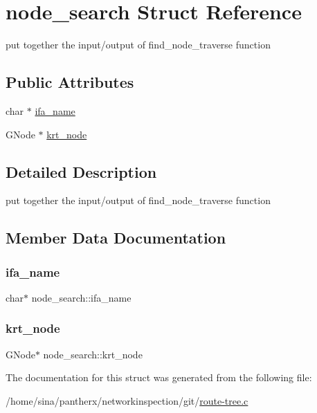 \hypertarget{structnode__search}{}\section{node\+\_\+search Struct Reference}
\label{structnode__search}


put together the input/output of find\+\_\+node\+\_\+traverse function  


\subsection*{Public Attributes}
\begin{DoxyCompactItemize}
\item 
char $\ast$ \hyperlink{structnode__search_ac34f755e54e8377475e42e4d9b1166cd}{ifa\+\_\+name}
\item 
G\+Node $\ast$ \hyperlink{structnode__search_acef2809bd08e8676c77b64dbb9f933d1}{krt\+\_\+node}
\end{DoxyCompactItemize}


\subsection{Detailed Description}
put together the input/output of find\+\_\+node\+\_\+traverse function 

\subsection{Member Data Documentation}
\mbox{\label{structnode__search_ac34f755e54e8377475e42e4d9b1166cd}} 
\subsubsection{\texorpdfstring{ifa\+\_\+name}{ifa\_name}}
{\footnotesize\ttfamily char$\ast$ node\+\_\+search\+::ifa\+\_\+name}

\mbox{\label{structnode__search_acef2809bd08e8676c77b64dbb9f933d1}} 
\subsubsection{\texorpdfstring{krt\+\_\+node}{krt\_node}}
{\footnotesize\ttfamily G\+Node$\ast$ node\+\_\+search\+::krt\+\_\+node}



The documentation for this struct was generated from the following file\+:\begin{DoxyCompactItemize}
\item 
/home/sina/pantherx/networkinspection/git/\hyperlink{route-tree_8c}{route-\/tree.\+c}\end{DoxyCompactItemize}

